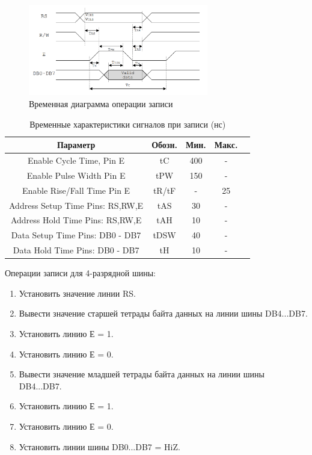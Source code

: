 \documentclass[a4paper,oneside ,14pt]{extreport}
\begin{document}
\begin{figure}[!ht]
	\centering
	\includegraphics[width=0.7\textwidth]{image/LCD_WR_2.PNG}
	\caption{Временная диаграмма операции записи}
	\label{full_adder}
\end{figure}

\begin{table}[!ht]
	\begin{center}
		\begin{tabular}{c c c c c}
			\hline\hline
			Параметр 							& Обозн. 	& Мин. 	& Макс. \\
			\hline
			Enable Cycle Time, Pin E 			& tC		& 400 	& 	- 	\\
			Enable Pulse Width Pin E 			& tPW 		& 150 	& 	- 	\\
			Enable Rise/Fall Time Pin E 		& tR/tF 	& - 	& 	25	\\
			Address Setup Time Pins: RS,RW,E 	& tAS 		& 30 	& 	-	\\
			Address Hold Time Pins: RS,RW,E 	& tAH 		& 10 	& 	-	\\
			Data Setup Time Pins: DB0 - DB7 	& tDSW 		& 40 	& 	-	\\
			Data Hold Time Pins: DB0 - DB7  	& tH 		& 10 	& 	-	\\
			\hline
		\end{tabular}
		\caption{Временные характеристики сигналов при записи (нс)}
		\label{LCD_TO_FPGA_WR_TABLE}
	\end{center}
\end{table}

Операции записи для 4-разрядной шины:
\begin{enumerate}
	\item Установить значение линии RS.
	\item Вывести значение старшей тетрады байта данных на линии шины DB4...DB7.
	\item Установить линию Е = 1.
	\item Установить линию Е = 0.
	\item Вывести значение младшей тетрады байта данных на линии шины DB4...DB7.
	\item Установить линию Е = 1.
	\item Установить линию Е = 0.
	\item Установить линии шины DB0...DB7 = HiZ.
\end{enumerate}
\end{document}
